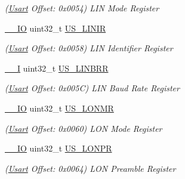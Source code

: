 \begin{DoxyCompactItemize}
\begin{DoxyCompactList}\small\item\em (\mbox{\hyperlink{structUsart}{Usart}} Offset\+: 0x0054) L\+IN Mode Register \end{DoxyCompactList}\item 
\mbox{\label{structUsart_ae1c2311c3a653045f1e05e8b29f7faa6}} 
\mbox{\hyperlink{core__cm7_8h_aec43007d9998a0a0e01faede4133d6be}{\+\_\+\+\_\+\+IO}} uint32\+\_\+t \mbox{\hyperlink{structUsart_ae1c2311c3a653045f1e05e8b29f7faa6}{U\+S\+\_\+\+L\+I\+N\+IR}}
\begin{DoxyCompactList}\small\item\em (\mbox{\hyperlink{structUsart}{Usart}} Offset\+: 0x0058) L\+IN Identifier Register \end{DoxyCompactList}\item 
\mbox{\label{structUsart_aad379864784ee0f62b84c6b35aeecd13}} 
\mbox{\hyperlink{core__cm7_8h_af63697ed9952cc71e1225efe205f6cd3}{\+\_\+\+\_\+I}} uint32\+\_\+t \mbox{\hyperlink{structUsart_aad379864784ee0f62b84c6b35aeecd13}{U\+S\+\_\+\+L\+I\+N\+B\+RR}}
\begin{DoxyCompactList}\small\item\em (\mbox{\hyperlink{structUsart}{Usart}} Offset\+: 0x005C) L\+IN Baud Rate Register \end{DoxyCompactList}\item 
\mbox{\label{structUsart_a2accbe36c585232fc40389d52d538de6}} 
\mbox{\hyperlink{core__cm7_8h_aec43007d9998a0a0e01faede4133d6be}{\+\_\+\+\_\+\+IO}} uint32\+\_\+t \mbox{\hyperlink{structUsart_a2accbe36c585232fc40389d52d538de6}{U\+S\+\_\+\+L\+O\+N\+MR}}
\begin{DoxyCompactList}\small\item\em (\mbox{\hyperlink{structUsart}{Usart}} Offset\+: 0x0060) L\+ON Mode Register \end{DoxyCompactList}\item 
\mbox{\label{structUsart_a4d14ef17bce35a4627a869123ad13159}} 
\mbox{\hyperlink{core__cm7_8h_aec43007d9998a0a0e01faede4133d6be}{\+\_\+\+\_\+\+IO}} uint32\+\_\+t \mbox{\hyperlink{structUsart_a4d14ef17bce35a4627a869123ad13159}{U\+S\+\_\+\+L\+O\+N\+PR}}
\begin{DoxyCompactList}\small\item\em (\mbox{\hyperlink{structUsart}{Usart}} Offset\+: 0x0064) L\+ON Preamble Register \end{DoxyCompactList}\item 

\end{DoxyCompactItemize}
